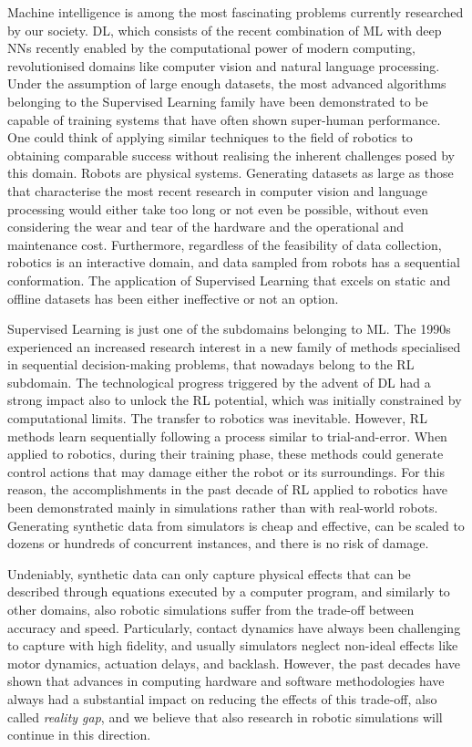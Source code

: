 Machine intelligence is among the most fascinating problems currently researched by our society.
\ac{DL}, which consists of the recent combination of \ac{ML} with deep \acp{NN} recently enabled by the computational power of modern computing, revolutionised domains like computer vision and natural language processing.
Under the assumption of large enough datasets, the most advanced algorithms belonging to the Supervised Learning family have been demonstrated to be capable of training systems that have often shown super-human performance.
One could think of applying similar techniques to the field of robotics to obtaining comparable success without realising the inherent challenges posed by this domain.
Robots are physical systems.
Generating datasets as large as those that characterise the most recent research in computer vision and language processing would either take too long or not even be possible, without even considering the wear and tear of the hardware and the operational and maintenance cost.
Furthermore, regardless of the feasibility of data collection, robotics is an interactive domain, and data sampled from robots has a sequential conformation.
The application of Supervised Learning that excels on static and offline datasets has been either ineffective or not an option.

Supervised Learning is just one of the subdomains belonging to \ac{ML}.
The 1990s experienced an increased research interest in a new family of methods specialised in sequential decision-making problems, that nowadays belong to the \ac{RL} subdomain. 
The technological progress triggered by the advent of \ac{DL} had a strong impact also to unlock the \ac{RL} potential, which was initially constrained by computational limits.
The transfer to robotics was inevitable.
However, \ac{RL} methods learn sequentially following a process similar to trial-and-error.
When applied to robotics, during their training phase, these methods could generate control actions that may damage either the robot or its surroundings. 
For this reason, the accomplishments in the past decade of \ac{RL} applied to robotics have been demonstrated mainly in simulations rather than with real-world robots.
Generating synthetic data from simulators is cheap and effective, can be scaled to dozens or hundreds of concurrent instances, and there is no risk of damage.

Undeniably, synthetic data can only capture physical effects that can be described through equations executed by a computer program, and similarly to other domains, also robotic simulations suffer from the trade-off between accuracy and speed.
Particularly, contact dynamics have always been challenging to capture with high fidelity, and usually simulators neglect non-ideal effects like motor dynamics, actuation delays, and backlash.
However, the past decades have shown that advances in computing hardware and software methodologies have always had a substantial impact on reducing the effects of this trade-off, also called \emph{reality gap}, and we believe that also research in robotic simulations will continue in this direction.

